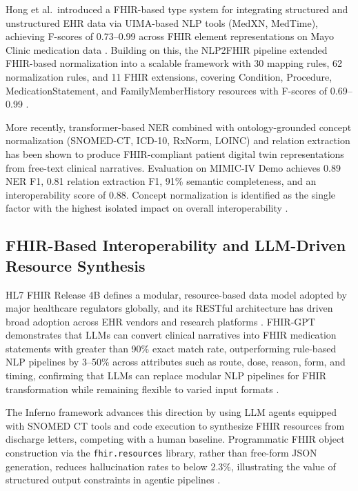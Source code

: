 Hong et al.\ introduced a FHIR-based type system for integrating structured and unstructured EHR data via UIMA-based NLP tools (MedXN, MedTime), achieving F-scores of 0.73--0.99 across FHIR element representations on Mayo Clinic medication data \cite{hong2017integrating}. Building on this, the NLP2FHIR pipeline extended FHIR-based normalization into a scalable framework with 30 mapping rules, 62 normalization rules, and 11 FHIR extensions, covering Condition, Procedure, MedicationStatement, and FamilyMemberHistory resources with F-scores of 0.69--0.99 \cite{hong2020nlp2fhir}.

More recently, transformer-based NER combined with ontology-grounded concept normalization (SNOMED-CT, ICD-10, RxNorm, LOINC) and relation extraction has been shown to produce FHIR-compliant patient digital twin representations from free-text clinical narratives. Evaluation on MIMIC-IV Demo achieves 0.89 NER F1, 0.81 relation extraction F1, 91\% semantic completeness, and an interoperability score of 0.88. Concept normalization is identified as the single factor with the highest isolated impact on overall interoperability \cite{brens2025semantic}.

\subsection{FHIR-Based Interoperability and LLM-Driven Resource Synthesis}
HL7 FHIR Release 4B defines a modular, resource-based data model adopted by major healthcare regulators globally, and its RESTful architecture has driven broad adoption across EHR vendors and research platforms \cite{hl7fhir2022r4b}. FHIR-GPT demonstrates that LLMs can convert clinical narratives into FHIR medication statements with greater than 90\% exact match rate, outperforming rule-based NLP pipelines by 3--50\% across attributes such as route, dose, reason, form, and timing, confirming that LLMs can replace modular NLP pipelines for FHIR transformation while remaining flexible to varied input formats \cite{li2024fhirgpt}.

The Inferno framework advances this direction by using LLM agents equipped with SNOMED CT tools and code execution to synthesize FHIR resources from discharge letters, competing with a human baseline. Programmatic FHIR object construction via the \texttt{fhir.resources} library, rather than free-form JSON generation, reduces hallucination rates to below 2.3\%, illustrating the value of structured output constraints in agentic pipelines \cite{frei2025inferno}.

